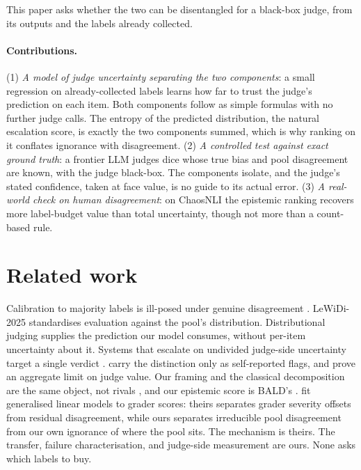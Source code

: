 \documentclass{article}
\begin{document}
This paper asks whether the two can be disentangled for a black-box judge, from
its outputs and the labels already collected.

\paragraph{Contributions.}
(1) \emph{A model of judge uncertainty separating the two components}: a small
regression on already-collected labels learns how far to trust the judge's
prediction on each item. Both components follow as simple formulas with no further
judge calls. The entropy of the predicted distribution, the
natural escalation score, is exactly the two components summed, which is why ranking
on it conflates ignorance with disagreement.
(2) \emph{A controlled test against exact ground truth}: a frontier LLM judges dice
whose true bias and pool disagreement are known, with the judge black-box.
The components isolate, and the judge's stated confidence, taken at face value,
is no guide to its actual error.
(3) \emph{A real-world check on human disagreement}: on ChaosNLI the epistemic
ranking recovers more label-budget value than total uncertainty, though not more
than a count-based rule.

\section{Related work}
\label{sec:related}

Calibration to majority labels is ill-posed under genuine disagreement
\citep{baan2022,plank2022}. LeWiDi-2025 \citep{leonardelli2025} standardises evaluation
against the pool's distribution. Distributional judging \citep{chen2025,wang2025}
supplies the prediction our model consumes, without per-item uncertainty about it.
Systems that escalate on undivided judge-side uncertainty target a single verdict
\citep{jung2025,sheng2025,badshah2026}. \citet{bachar2026} carry the distinction only as
self-reported flags, and \citet{dorner2025} prove an aggregate limit on judge value. Our
framing and the classical decomposition are the same object, not rivals
\citep{kotelevskii2025}, and our epistemic score is BALD's
\citep{houlsby2011,bickfordsmith2023,nguyen2019}. \citet{dubois2026} fit generalised
linear models to grader scores: theirs separates grader severity offsets from residual
disagreement, while ours separates irreducible pool disagreement from our own
ignorance of where the pool sits. The mechanism is theirs. The transfer, failure characterisation,
and judge-side measurement are ours. None asks which labels to buy.
\end{document}
